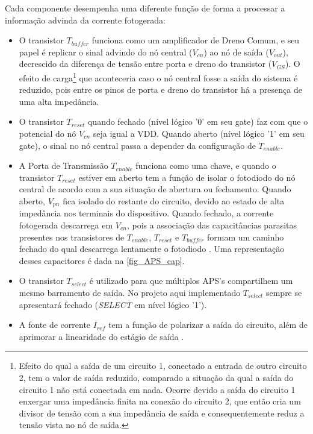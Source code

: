 Cada componente desempenha uma diferente função de forma a processar a informação advinda da corrente fotogerada:

\begin{itemize}

    \item O transistor $T_{buffer}$ funciona como um amplificador de Dreno Comum, e seu papel \'e replicar o sinal advindo do n\'o central ($V_{cn}$) ao n\'o de sa\'ida ($V_{out}$), decrescido da diferença de tensão entre porta e dreno do transistor ($V_{GS}$). O efeito de carga\footnote{Efeito do qual a saída de um circuito 1, conectado a entrada de outro circuito 2, tem o valor de saída reduzido, comparado a situação da qual a saída do circuito 1 não está conectada em nada. Ocorre devido a saída do circuito 1 enxergar uma impedância finita na conexão do circuito 2, que então cria um divisor de tensão com a sua impedância de saída e consequentemente reduz a tensão vista no nó de saída.} que aconteceria caso o n\'o central fosse a saída do sistema é reduzido, pois entre os pinos de porta e dreno do transistor há a presença de uma alta impedância.

    \item O transistor $T_{reset}$ quando fechado (nível lógico '0' em seu gate) faz com que o potencial do nó $V_{cn}$ seja igual a VDD. Quando aberto (nível lógico '1' em seu gate), o sinal no n\'o central passa a depender da configuração de $T_{enable}$.

    \item A Porta de Transmissão $T_{enable}$ funciona como uma chave, e quando o transistor $T_{reset}$ estiver em aberto tem a função de isolar o fotodiodo do nó central de acordo com a sua situação de abertura ou fechamento. Quando aberto, $V_{pn}$ fica isolado do restante do circuito, devido ao estado de alta imped\^ancia nos terminais do dispositivo. Quando fechado, a corrente fotogerada descarrega em $V_{cn}$, pois a associação das capacitâncias parasitas presentes nos transistores de $T_{enable}$, $T_{reset}$ e $T_{buffer}$ formam um caminho fechado do qual descarrega lentamente o fotodiodo \cite{LidianeCampos}. Uma representação desses capacitores \'e dada na \autoref{fig_APS_cap}.
    
    \item O transistor $T_{select}$ \'e utilizado para que m\'ultiplos APS's compartilhem um mesmo barramento de sa\'ida. No projeto aqui implementado $T_{select}$ sempre se apresentar\'a fechado (\textit{SELECT} em n\'ivel l\'ogico '1').
    
    \item A fonte de corrente \textit{$I_{ref}$} tem a função de polarizar a sa\'ida do circuito, além de aprimorar a linearidade do estágio de sa\'ida \cite{RazaviFundM}.

\end{itemize}

